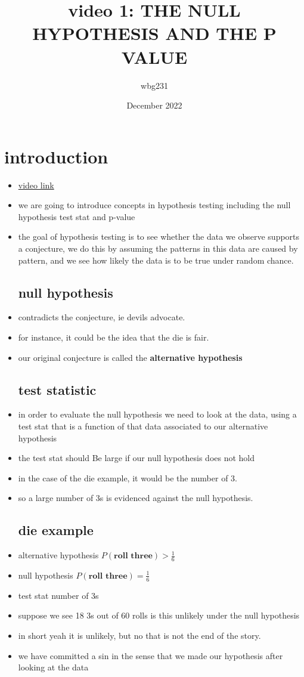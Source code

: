 \documentclass{article}
\title{video 1: THE NULL HYPOTHESIS AND THE P VALUE}
\author{wbg231 }
\date{December 2022}
\begin{document}
\maketitle

\section*{introduction}
\begin{itemize}
\item \href{https://www.youtube.com/watch?v=d0jC1pQN6P8&list=PLBEf5mJtE6KuZ5NBQMuWIMsiOOrV9ibzm&index=78}{video link}
\item we are going to introduce concepts in hypothesis testing including the null hypothesis test stat and p-value 
\item the goal of hypothesis testing is to see whether the data we observe supports a conjecture, we do this by assuming the patterns in this data are caused by pattern, and we see how likely the data is to be true under random chance. 
\subsection{null hypothesis}
\item contradicts the conjecture, ie devils advocate. 
\item for instance, it could be the idea that the die is fair. 
\item our original conjecture is called the \textbf{alternative hypothesis }
\subsection{test statistic}
\item in order to evaluate the null hypothesis we need to look at the data, using a test stat that is a function of that data associated to our alternative hypothesis 
\item the test stat should Be large if our null hypothesis does not hold 
\item in the case of the die example, it would be the number of 3. 
\item so a large number of 3s is evidenced against the null hypothesis. 
\subsection{die example}
\item alternative hypothesis $P(\textbf{roll three})> \frac{1}{6}$
\item null hypothesis $P(\textbf{roll three})=\frac{1}{6}$
\item test stat number of 3s
\item suppose we see 18 3s out of 60 rolls is this unlikely under the null hypothesis 
\item in short yeah it is unlikely, but no that is not the end of the story. 
\item we have committed a sin in the sense that we made our hypothesis after looking at the data 

\end{itemize}
\end{document}
